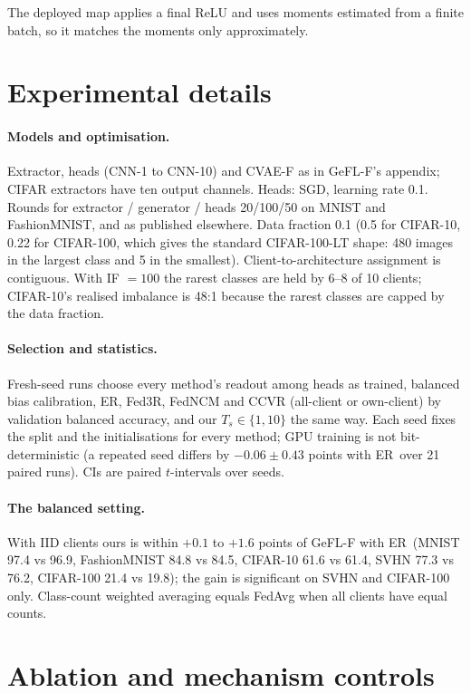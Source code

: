 \documentclass[10pt]{article}
\theoremstyle{plain}
\theoremstyle{definition}
\newcommand{\ER}{\textsc{ER}}
\begin{document}
The deployed map applies a final ReLU and uses moments estimated from a finite batch, so it matches the moments only
approximately.

\section{Experimental details}\label{app:protocol}

\paragraph{Models and optimisation.} Extractor, heads (CNN-1 to CNN-10) and CVAE-F as in GeFL-F's appendix; CIFAR
extractors have ten output channels. Heads: SGD, learning rate 0.1. Rounds for extractor / generator / heads 20/100/50
on MNIST and FashionMNIST, and as published elsewhere. Data fraction 0.1 (0.5 for CIFAR-10, 0.22 for CIFAR-100, which
gives the standard CIFAR-100-LT shape: 480 images in the largest class and 5 in the smallest). Client-to-architecture
assignment is contiguous. With IF $=100$ the rarest classes are held by 6--8 of 10 clients; CIFAR-10's realised
imbalance is 48:1 because the rarest classes are capped by the data fraction.

\paragraph{Selection and statistics.} Fresh-seed runs choose every method's readout among heads as trained, balanced
bias calibration, \ER, Fed3R, FedNCM and CCVR (all-client or own-client) by validation balanced accuracy, and our
$T_s\in\{1,10\}$ the same way. Each seed fixes the split and the initialisations for every method; GPU training is not
bit-deterministic (a repeated seed differs by $-0.06\pm0.43$ points with \ER\ over 21 paired runs). CIs are paired
$t$-intervals over seeds.

\paragraph{The balanced setting.} With IID clients ours is within $+0.1$ to $+1.6$ points of GeFL-F with \ER\ (MNIST
97.4 vs 96.9, FashionMNIST 84.8 vs 84.5, CIFAR-10 61.6 vs 61.4, SVHN 77.3 vs 76.2, CIFAR-100 21.4 vs 19.8); the gain is
significant on SVHN and CIFAR-100 only. Class-count weighted averaging equals FedAvg when all clients have equal counts.

\section{Ablation and mechanism controls}\label{app:ablation}
\end{document}
